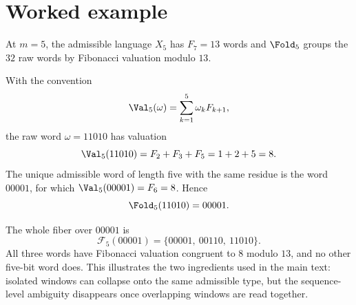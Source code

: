 \section{Worked example}\label{app:worked-example}

At $m=5$, the admissible language $X_5$ has $F_7=13$ words and $\Fold_5$ groups the $32$ raw words by Fibonacci valuation modulo $13$.

With the convention
\[
\Val_5(\omega)=\sum_{k=1}^5 \omega_k F_{k+1},
\]
the raw word $\omega=11010$ has valuation
\[
\Val_5(11010)=F_2+F_3+F_5=1+2+5=8.
\]
The unique admissible word of length five with the same residue is the word $00001$, for which $\Val_5(00001)=F_6=8$. Hence
\[
\Fold_5(11010)=00001.
\]

The whole fiber over $00001$ is
\[
\mathcal F_5(00001)=\{00001,\ 00110,\ 11010\}.
\]
All three words have Fibonacci valuation congruent to $8$ modulo $13$, and no other five-bit word does. This illustrates the two ingredients used in the main text: isolated windows can collapse onto the same admissible type, but the sequence-level ambiguity disappears once overlapping windows are read together.
